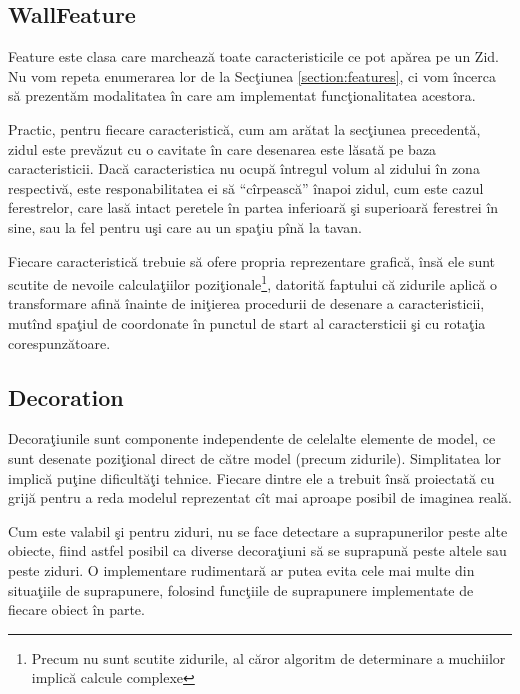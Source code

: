 \subsection{WallFeature}

Feature este clasa care marchează toate caracteristicile ce pot apărea pe un
Zid. Nu vom repeta enumerarea lor de la Secţiunea \ref{section:features}, ci vom
încerca să prezentăm modalitatea în care am implementat funcţionalitatea
acestora.

Practic, pentru fiecare caracteristică, cum am arătat la secţiunea precedentă,
zidul este prevăzut cu o cavitate în care desenarea este lăsată pe baza
caracteristicii. Dacă caracteristica nu ocupă întregul volum al zidului în zona
respectivă, este responabilitatea ei să ``cîrpească'' înapoi zidul, cum este
cazul ferestrelor, care lasă intact peretele în partea inferioară şi superioară
ferestrei în sine, sau la fel pentru uşi care au un spaţiu pînă la tavan.

Fiecare caracteristică trebuie să ofere propria reprezentare grafică, însă ele
sunt scutite de nevoile calculaţiilor poziţionale\footnote{Precum nu sunt
scutite zidurile, al căror algoritm de determinare a muchiilor implică calcule
complexe}, datorită faptului că zidurile aplică o transformare afină înainte de
iniţierea procedurii de desenare a caracteristicii, mutînd spaţiul de coordonate
în punctul de start al caractersticii şi cu rotaţia corespunzătoare.

\subsection{Decoration}

Decoraţiunile sunt componente independente de celelalte elemente de model, ce
sunt desenate poziţional direct de către model (precum zidurile). Simplitatea
lor implică puţine dificultăţi tehnice. Fiecare dintre ele a trebuit însă
proiectată cu grijă pentru a reda modelul reprezentat cît mai aproape posibil de
imaginea reală.

Cum este valabil şi pentru ziduri, nu se face detectare a suprapunerilor peste
alte obiecte, fiind astfel posibil ca diverse decoraţiuni să se suprapună peste
altele sau peste ziduri. O implementare rudimentară ar putea evita cele mai
multe din situaţiile de suprapunere, folosind funcţiile de suprapunere
implementate de fiecare obiect în parte.
